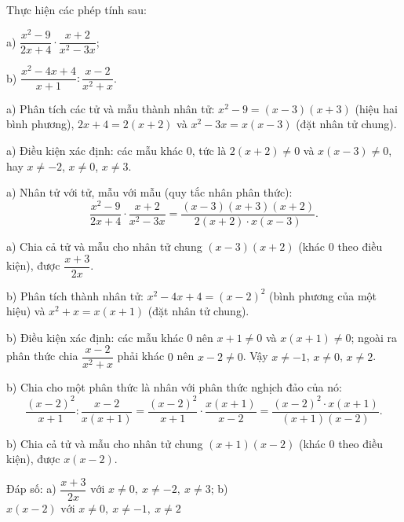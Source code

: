 \begin{problem}[8DS-PS-004]
Thực hiện các phép tính sau:

a) $\dfrac{x^2 - 9}{2x + 4} \cdot \dfrac{x + 2}{x^2 - 3x}$;

b) $\dfrac{x^2 - 4x + 4}{x + 1} : \dfrac{x - 2}{x^2 + x}$.

\begin{solution}
a) Phân tích các tử và mẫu thành nhân tử: $x^2 - 9 = (x - 3)(x + 3)$ (hiệu hai bình phương), $2x + 4 = 2(x + 2)$ và $x^2 - 3x = x(x - 3)$ (đặt nhân tử chung).

a) Điều kiện xác định: các mẫu khác $0$, tức là $2(x + 2) \neq 0$ và $x(x - 3) \neq 0$, hay $x \neq -2$, $x \neq 0$, $x \neq 3$.

a) Nhân tử với tử, mẫu với mẫu (quy tắc nhân phân thức):
\[ \dfrac{x^2 - 9}{2x + 4} \cdot \dfrac{x + 2}{x^2 - 3x} = \dfrac{(x - 3)(x + 3)(x + 2)}{2(x + 2) \cdot x(x - 3)}. \]

a) Chia cả tử và mẫu cho nhân tử chung $(x - 3)(x + 2)$ (khác $0$ theo điều kiện), được $\dfrac{x + 3}{2x}$.

b) Phân tích thành nhân tử: $x^2 - 4x + 4 = (x - 2)^2$ (bình phương của một hiệu) và $x^2 + x = x(x + 1)$ (đặt nhân tử chung).

b) Điều kiện xác định: các mẫu khác $0$ nên $x + 1 \neq 0$ và $x(x + 1) \neq 0$; ngoài ra phân thức chia $\dfrac{x - 2}{x^2 + x}$ phải khác $0$ nên $x - 2 \neq 0$. Vậy $x \neq -1$, $x \neq 0$, $x \neq 2$.

b) Chia cho một phân thức là nhân với phân thức nghịch đảo của nó:
\[ \dfrac{(x - 2)^2}{x + 1} : \dfrac{x - 2}{x(x + 1)} = \dfrac{(x - 2)^2}{x + 1} \cdot \dfrac{x(x + 1)}{x - 2} = \dfrac{(x - 2)^2 \cdot x(x + 1)}{(x + 1)(x - 2)}. \]

b) Chia cả tử và mẫu cho nhân tử chung $(x + 1)(x - 2)$ (khác $0$ theo điều kiện), được $x(x - 2)$.

Đáp số: a) $\boxed{\dfrac{x + 3}{2x} \text{ với } x \neq 0,\ x \neq -2,\ x \neq 3}$; b) $\boxed{x(x - 2) \text{ với } x \neq 0,\ x \neq -1,\ x \neq 2}$
\end{solution}
\end{problem}

